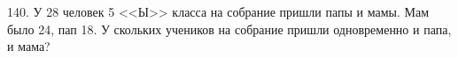 140. У 28 человек 5 <<Ы>> класса на собрание пришли папы и мамы. Мам было 24, пап 18. У скольких учеников на собрание пришли одновременно и папа, и мама?\\
